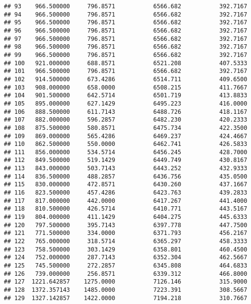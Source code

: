 \documentclass[]{article}
\begin{document}
\begin{verbatim}
## 93    966.500000     796.8571           6566.682           392.7167
## 94    966.500000     796.8571           6566.682           392.7167
## 95    966.500000     796.8571           6566.682           392.7167
## 96    966.500000     796.8571           6566.682           392.7167
## 97    966.500000     796.8571           6566.682           392.7167
## 98    966.500000     796.8571           6566.682           392.7167
## 99    966.500000     796.8571           6566.682           392.7167
## 100   921.000000     688.8571           6521.208           407.5333
## 101   966.500000     796.8571           6566.682           392.7167
## 102   914.500000     673.4286           6514.711           409.6500
## 103   908.000000     658.0000           6508.215           411.7667
## 104   901.500000     642.5714           6501.719           413.8833
## 105   895.000000     627.1429           6495.223           416.0000
## 106   888.500000     611.7143           6488.726           418.1167
## 107   882.000000     596.2857           6482.230           420.2333
## 108   875.500000     580.8571           6475.734           422.3500
## 109   869.000000     565.4286           6469.237           424.4667
## 110   862.500000     550.0000           6462.741           426.5833
## 111   856.000000     534.5714           6456.245           428.7000
## 112   849.500000     519.1429           6449.749           430.8167
## 113   843.000000     503.7143           6443.252           432.9333
## 114   836.500000     488.2857           6436.756           435.0500
## 115   830.000000     472.8571           6430.260           437.1667
## 116   823.500000     457.4286           6423.763           439.2833
## 117   817.000000     442.0000           6417.267           441.4000
## 118   810.500000     426.5714           6410.771           443.5167
## 119   804.000000     411.1429           6404.275           445.6333
## 120   797.500000     395.7143           6397.778           447.7500
## 121   771.500000     334.0000           6371.793           456.2167
## 122   765.000000     318.5714           6365.297           458.3333
## 123   758.500000     303.1429           6358.801           460.4500
## 124   752.000000     287.7143           6352.304           462.5667
## 125   745.500000     272.2857           6345.808           464.6833
## 126   739.000000     256.8571           6339.312           466.8000
## 127  1221.642857    1275.0000           7126.146           315.9000
## 128  1372.357143    1485.0000           7223.391           308.5667
## 129  1327.142857    1422.0000           7194.218           310.7667

\end{verbatim}
\end{document}
